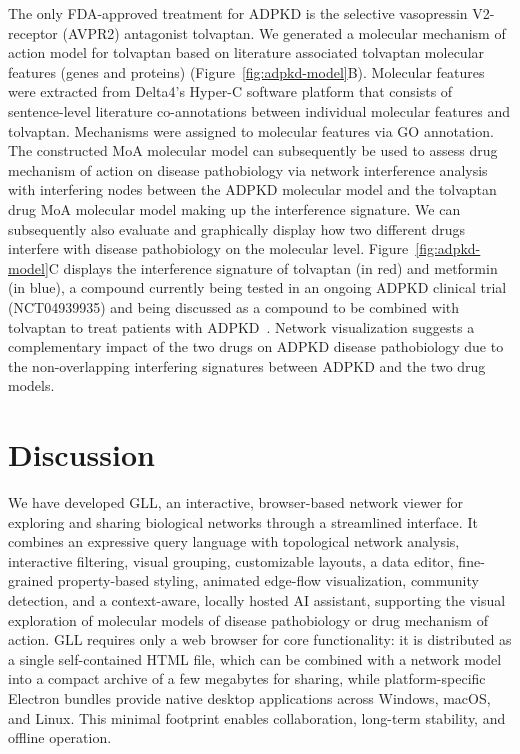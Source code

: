 The only FDA-approved treatment for ADPKD is the selective vasopressin V2-receptor (AVPR2) antagonist tolvaptan. We generated a molecular mechanism of action model for tolvaptan based on literature associated tolvaptan molecular features (genes and proteins) (Figure~\ref{fig:adpkd-model}B). Molecular features were extracted from Delta4's Hyper-C software platform that consists of sentence-level literature co-annotations between individual molecular features and tolvaptan. Mechanisms were assigned to molecular features via GO annotation. The constructed MoA molecular model can subsequently be used to assess drug mechanism of action on disease pathobiology via network interference analysis with interfering nodes between the ADPKD molecular model and the tolvaptan drug MoA molecular model making up the interference signature. We can subsequently also evaluate and graphically display how two different drugs interfere with disease pathobiology on the molecular level. Figure~\ref{fig:adpkd-model}C displays the interference signature of tolvaptan (in red) and metformin (in blue), a compound currently being tested in an ongoing ADPKD clinical trial (NCT04939935) and being discussed as a compound to be combined with tolvaptan to treat patients with ADPKD~\citep{stanleySecondaryAnalysisConcurrent2024}. Network visualization suggests a complementary impact of the two drugs on ADPKD disease pathobiology due to the non-overlapping interfering signatures between ADPKD and the two drug models.

\section{Discussion}
We have developed GLL, an interactive, browser-based network viewer for exploring and sharing biological networks through a streamlined interface. It combines an expressive query language with topological network analysis, interactive filtering, visual grouping, customizable layouts, a data editor, fine-grained property-based styling, animated edge-flow visualization, community detection, and a context-aware, locally hosted AI assistant, supporting the visual exploration of molecular models of disease pathobiology or drug mechanism of action. GLL requires only a web browser for core functionality: it is distributed as a single self-contained HTML file, which can be combined with a network model into a compact archive of a few megabytes for sharing, while platform-specific Electron bundles provide native desktop applications across Windows, macOS, and Linux. This minimal footprint enables collaboration, long-term stability, and offline operation.

